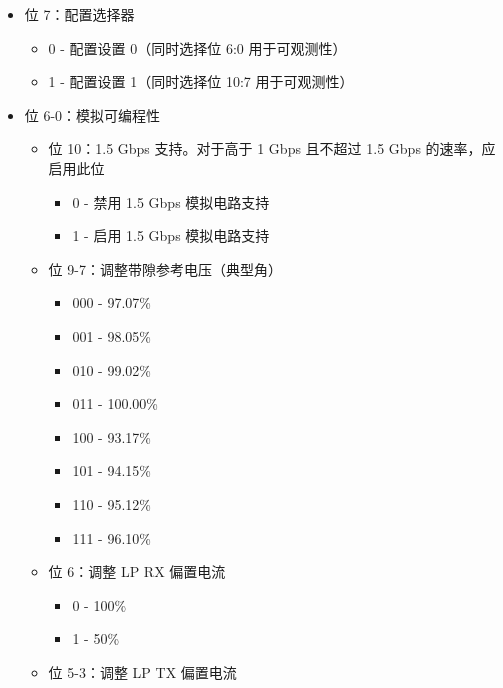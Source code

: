 \documentclass[main\_\_CN.tex]{subfiles}
\begin{document}
\begin{itemize}
        \begin{itemize}
            \item 位 7：配置选择器
                \begin{itemize}
                    \item 0 - 配置设置 0（同时选择位 6:0 用于可观测性）
                    \item 1 - 配置设置 1（同时选择位 10:7 用于可观测性）
                \end{itemize}
            \item 位 6-0：模拟可编程性
                \begin{itemize}
                    \item 位 10：1.5 Gbps 支持。对于高于 1 Gbps 且不超过 1.5 Gbps 的速率，应启用此位
                        \begin{itemize}
                            \item 0 - 禁用 1.5 Gbps 模拟电路支持
                            \item 1 - 启用 1.5 Gbps 模拟电路支持
                        \end{itemize}
                    \item 位 9-7：调整带隙参考电压（典型角）
                        \begin{itemize}
                            \item 000 - 97.07\%
                            \item 001 - 98.05\%
                            \item 010 - 99.02\%
                            \item 011 - 100.00\%
                            \item 100 - 93.17\%
                            \item 101 - 94.15\%
                            \item 110 - 95.12\%
                            \item 111 - 96.10\%
                        \end{itemize}
                    \item 位 6：调整 LP RX 偏置电流
                        \begin{itemize}
                            \item 0 - 100\%
                            \item 1 - 50\%
                        \end{itemize}
                    \item 位 5-3：调整 LP TX 偏置电流

\end{itemize}
\end{itemize}
\end{itemize}
\end{document}
